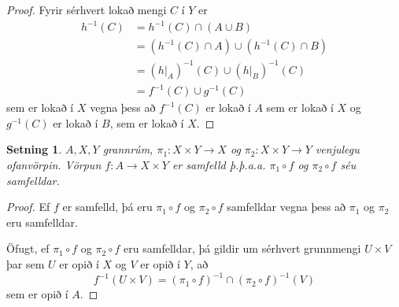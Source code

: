 \documentclass[a4paper,icelandic]{book}
\theoremstyle{definition}
\theoremstyle{plain}
\newtheorem{setn}{Setning}[section]
\theoremstyle{remark}
\begin{document}
\begin{proof}
  Fyrir sérhvert lokað mengi $C$ í $Y$ er 
  \begin{align*}
    h^{-1}(C)
    &= h^{-1}(C)\cap (A\cup B) \\
    &= (h^{-1}(C)\cap A)\cup (h^{-1}(C)\cap B) \\
    &= (h|_A)^{-1}(C)\cup (h|_B)^{-1}(C) \\
    &= f^{-1}(C)\cup g^{-1}(C)
  \end{align*}
  sem er lokað í $X$ vegna þess að $f^{-1}(C)$ er lokað í $A$ sem er lokað í
  $X$ og $g^{-1}(C)$ er lokað í $B$, sem er lokað í $X$.
\end{proof}
\begin{setn}
  $A,X,Y$ grannrúm, $\pi_1:X\times Y\to X$ og $\pi_2:X\times Y\to Y$ venjulegu
  ofanvörpin. Vörpun $f:A\to X\times Y$ er samfelld \emph{þ.þ.a.a.} $\pi_1\circ
  f$ og $\pi_2\circ f$ séu samfelldar.
\end{setn}
\begin{proof}
  Ef $f$ er samfelld, þá eru $\pi_1\circ f$ og $\pi_2\circ f$ samfelldar vegna
  þess að $\pi_1$ og $\pi_2$ eru samfelldar.

  Öfugt, ef $\pi_1\circ f$ og $\pi_2\circ f$ eru samfelldar, þá gildir um
  sérhvert grunnmengi $U\times V$ þar sem $U$ er opið í $X$ og $V$ er opið í
  $Y$, að 
  \[
  f^{-1}(U\times V)
  = (\pi_1\circ f)^{-1}\cap (\pi_2\circ f)^{-1}(V)
  \]
  sem er opið í $A$.
\end{proof}

\end{document}
